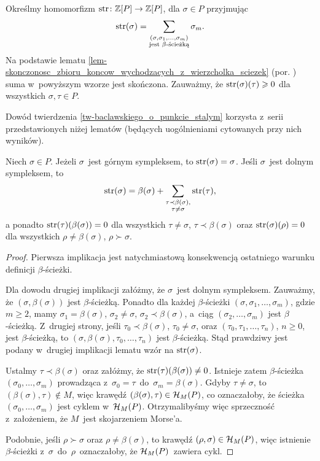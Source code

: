 Określmy homomorfizm $\operatorname{str}\colon \mathbb{Z}[P]\to \mathbb{Z}[P]$, dla $\sigma\in P$ przyjmując \[\operatorname{str}(\sigma)=\sum_{\substack{(\sigma,\sigma_1,\ldots,\sigma_m)\\\text{jest } \beta\text{-ścieżką}}}\sigma_m.\] Na podstawie lematu \ref{lem-skonczonosc_zbioru_koncow_wychodzacych_z_wierzcholka_sciezek} (por. \cite[Theorem 5.2]{Baclawski}) suma w~powyższym wzorze jest skończona. Zauważmy, że $\operatorname{str}(\sigma)(\tau)\geqslant 0$ dla wszystkich $\sigma,\tau\in P$. 

Dowód twierdzenia \ref{tw-baclawskiego_o_punkcie_stalym} korzysta z~serii przedstawionych niżej lematów (będących uogólnieniami cytowanych przy nich wyników). 

\begin{lem}\label{lem-liczenie_str}
Niech $\sigma\in P$. Jeżeli $\sigma$~jest górnym sympleksem, to \mbox{$\operatorname{str}(\sigma)=\sigma$}. Jeśli $\sigma$~jest dolnym sympleksem, to \[\operatorname{str}(\sigma)=\beta(\sigma) + \sum_{\substack{\tau\prec\beta(\sigma),\\ \tau\not=\sigma}}\operatorname{str}(\tau),\] a ponadto $\operatorname{str}(\tau)(\beta(\sigma))=0$ dla wszystkich $\tau\not=\sigma$, $\tau\prec\beta(\sigma)$ oraz $\operatorname{str}(\sigma)(\rho)=0$ dla wszystkich $\rho\not=\beta(\sigma)$, $\rho\succ\sigma$.
\end{lem}
\begin{proof}
Pierwsza implikacja jest natychmiastową konsekwencją ostatniego warunku definicji $\beta$-ścieżki. 

Dla dowodu drugiej implikacji załóżmy, że $\sigma$~jest dolnym sympleksem. Zauważmy, że $(\sigma,\beta(\sigma))$ jest $\beta$-ścieżką. Ponadto dla każdej $\beta$-ścieżki $(\sigma,\sigma_1,\ldots,\sigma_m)$, gdzie $m\geq 2$, mamy $\sigma_1=\beta(\sigma)$, $\sigma_2\not=\sigma$, $\sigma_2\prec\beta(\sigma)$, a~ciąg $(\sigma_2,\ldots,\sigma_m)$ jest \mbox{$\beta$-ścieżką}. Z~drugiej strony, jeśli $\tau_0\prec\beta(\sigma)$, $\tau_0\not=\sigma$, oraz $(\tau_0,\tau_1,\ldots,\tau_n)$, $n\geq 0$, jest $\beta$-ścieżką, to $(\sigma,\beta(\sigma),\tau_0,\ldots,\tau_n)$ jest $\beta$-ścieżką. Stąd prawdziwy jest podany w~drugiej implikacji lematu wzór na $\operatorname{str}(\sigma)$.

Ustalmy $\tau\prec\beta(\sigma)$ oraz załóżmy, że $\operatorname{str}(\tau)(\beta(\sigma))\not=0$. Istnieje zatem $\beta$-ścieżka $(\sigma_0,\ldots,\sigma_m)$ prowadząca z~$\sigma_0=\tau$~do~$\sigma_m=\beta(\sigma)$. Gdyby $\tau\not=\sigma$, to $(\beta(\sigma),\tau)\not\in M$, więc krawędź $(\beta(\sigma),\tau)\in \mathcal{H}_M(P)$, co oznaczałoby, że ścieżka $(\sigma_0,\ldots,\sigma_m)$ jest cyklem w~$\mathcal{H}_M(P)$. Otrzymalibyśmy więc sprzeczność z~założeniem, że $M$~jest skojarzeniem Morse'a.

Podobnie, jeśli $\rho\succ\sigma$ oraz $\rho\not=\beta(\sigma)$, to krawędź $(\rho,\sigma)\in\mathcal{H}_M(P)$, więc istnienie $\beta$-ścieżki z~$\sigma$~do~$\rho$~oznaczałoby, że $\mathcal{H}_M(P)$~zawiera cykl.
\end{proof}


